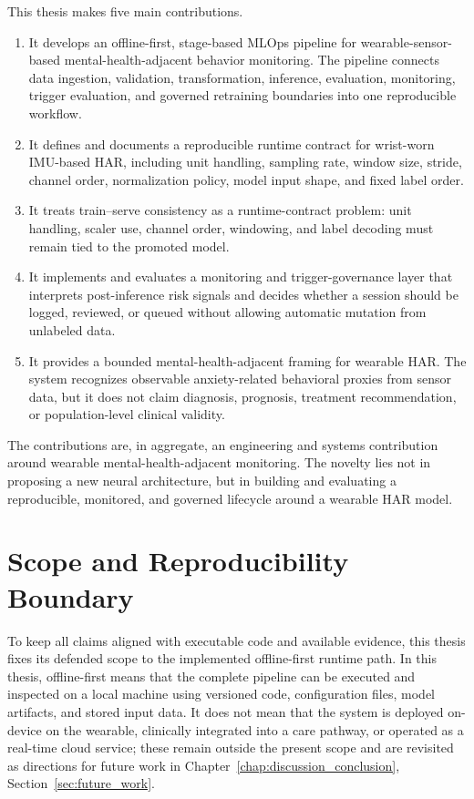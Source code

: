 This thesis makes five main contributions.

\begin{enumerate}
    \item It develops an offline-first, stage-based MLOps pipeline for wearable-sensor-based mental-health-adjacent behavior monitoring. The pipeline connects data ingestion, validation, transformation, inference, evaluation, monitoring, trigger evaluation, and governed retraining boundaries into one reproducible workflow.

    \item It defines and documents a reproducible runtime contract for wrist-worn IMU-based HAR, including unit handling, sampling rate, window size, stride, channel order, normalization policy, model input shape, and fixed label order.

    \item It treats train--serve consistency as a runtime-contract problem: unit handling, scaler use, channel order, windowing, and label decoding must remain tied to the promoted model.

    \item It implements and evaluates a monitoring and trigger-governance layer that interprets post-inference risk signals and decides whether a session should be logged, reviewed, or queued without allowing automatic mutation from unlabeled data.

    \item It provides a bounded mental-health-adjacent framing for wearable HAR. The system recognizes observable anxiety-related behavioral proxies from sensor data, but it does not claim diagnosis, prognosis, treatment recommendation, or population-level clinical validity.
\end{enumerate}

The contributions are, in aggregate, an engineering and systems contribution around wearable mental-health-adjacent monitoring. The novelty lies not in proposing a new neural architecture, but in building and evaluating a reproducible, monitored, and governed lifecycle around a wearable HAR model.

\section{Scope and Reproducibility Boundary}

To keep all claims aligned with executable code and available evidence, this thesis fixes its defended scope to the implemented offline-first runtime path. In this thesis, offline-first means that the complete pipeline can be executed and inspected on a local machine using versioned code, configuration files, model artifacts, and stored input data. It does not mean that the system is deployed on-device on the wearable, clinically integrated into a care pathway, or operated as a real-time cloud service; these remain outside the present scope and are revisited as directions for future work in Chapter~\ref{chap:discussion_conclusion}, Section~\ref{sec:future_work}.

